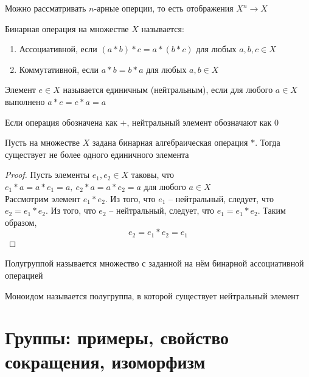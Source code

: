 \begin{note}
	Можно рассматривать $n$-арные оперции, то есть отображения $X^n \to X$
\end{note}

\begin{definition}
	Бинарная операция на множестве $X$ называется:
	\begin{enumerate}
		\item Ассоциативной, если $(a * b) * c = a * (b * c)$ для любых $a, b, c \in X$
		\item Коммутативной, если $a * b = b * a$ для любых $a, b \in X$
	\end{enumerate}
\end{definition}

\begin{definition}
	Элемент $e \in X$ называется единичным (нейтральным), если для любого $a \in X$ выполнено $a * e = e * a = a$
\end{definition}

\begin{note}
	Если операция обозначена как $+$, нейтральный элемент обозначают как $0$
\end{note}

\begin{property}
	Пусть на множестве $X$ задана бинарная алгебраическая операция $*$. Тогда существует не более одного единичного элемента
\end{property}

\begin{proof}
	Пусть элементы $e_1, e_2 \in X$ таковы, что $e_1 * a = a * e_1 = a, ~ e_2 * a = a * e_2 = a$ для любого $a \in X$ \\
	Рассмотрим элемент $e_1 * e_2$. Из того, что $e_1$ -- нейтральный, следует, что $e_2 = e_1 * e_2$. Из того, что $e_2$ -- нейтральный, следует, что $e_1 = e_1 * e_2$. Таким образом,
	$$ e_2 = e_1 * e_2 = e_1 $$
\end{proof}

\begin{definition}
	Полугруппой называется множество с заданной на нём бинарной ассоциативной операцией
\end{definition}

\begin{definition}
	Моноидом называется полугруппа, в которой существует нейтральный элемент
\end{definition}

\section{Группы: примеры, свойство сокращения, изоморфизм}

